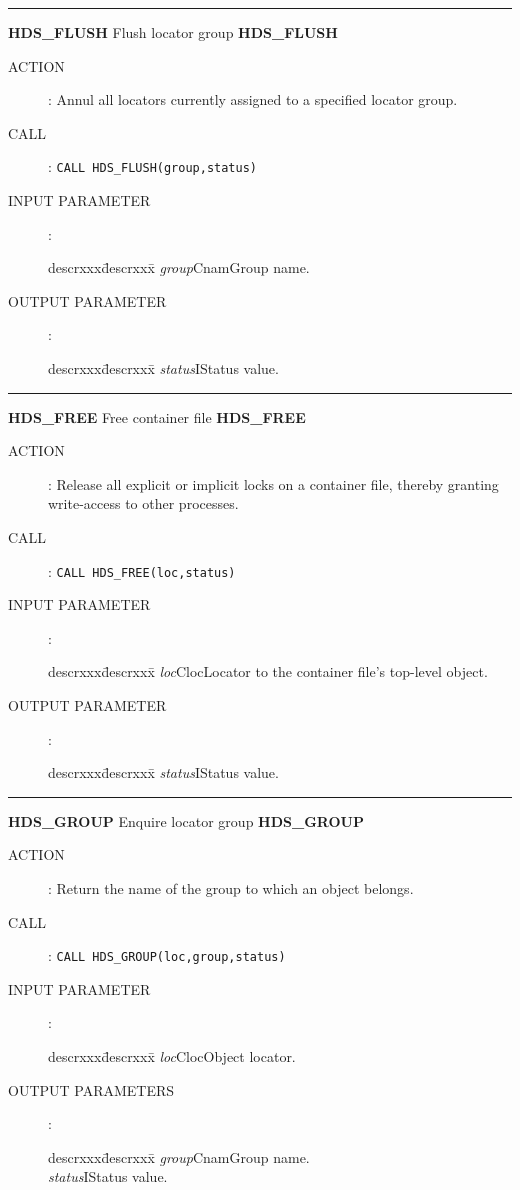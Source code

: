 \goodbreak
\rule{\textwidth}{0.3mm}
{\Large {\bf HDS\_FLUSH} \hfill Flush locator group \hfill {\bf HDS\_FLUSH}}
\begin{description}
\item [ACTION]:
Annul all locators currently assigned to a specified locator group.
\item [CALL]:
{\tt CALL HDS\_FLUSH(group,status)}
\item [INPUT PARAMETER]:
\begin{tabbing}
descrxxx\=descrxxx\=\kill
{\em group}\>Cnam\>Group name.
\end{tabbing}
\item [OUTPUT PARAMETER]:
\begin{tabbing}
descrxxx\=descrxxx\=\kill
{\em status}\>I\>Status value.
\end{tabbing}
\end{description}
\goodbreak
\rule{\textwidth}{0.3mm}
{\Large {\bf HDS\_FREE} \hfill Free container file \hfill {\bf HDS\_FREE}}
\begin{description}
\item [ACTION]:
Release all explicit or implicit locks on a container file, thereby granting
write-access to other processes.
\item [CALL]:
{\tt CALL HDS\_FREE(loc,status)}
\item [INPUT PARAMETER]:
\begin{tabbing}
descrxxx\=descrxxx\=\kill
{\em loc}\>Cloc\>Locator to the container file's top-level object.
\end{tabbing}
\item [OUTPUT PARAMETER]:
\begin{tabbing}
descrxxx\=descrxxx\=\kill
{\em status}\>I\>Status value.
\end{tabbing}
\end{description}
\goodbreak
\rule{\textwidth}{0.3mm}
{\Large {\bf HDS\_GROUP} \hfill Enquire locator group \hfill {\bf HDS\_GROUP}}
\begin{description}
\item [ACTION]:
Return the name of the group to which an object belongs.
\item [CALL]:
{\tt CALL HDS\_GROUP(loc,group,status)}
\item [INPUT PARAMETER]:
\begin{tabbing}
descrxxx\=descrxxx\=\kill
{\em loc}\>Cloc\>Object locator.
\end{tabbing}
\item [OUTPUT PARAMETERS]:
\begin{tabbing}
descrxxx\=descrxxx\=\kill
{\em group}\>Cnam\>Group name.\\
{\em status}\>I\>Status value.
\end{tabbing}
\end{description}
\goodbreak

